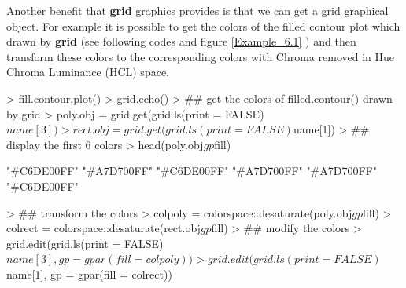 \documentclass{report}
\begin{document}
\newpage
Another benefit that \textbf{grid} graphics provides is that we can get a grid graphical object. For example it is possible to get the colors of the filled contour plot which drawn by \textbf{grid} (see following codes and figure \ref{Example_6.1} ) and then transform these colors to the corresponding colors with Chroma removed in Hue Chroma Luminance (HCL) space.
\begin{Schunk}
\begin{Sinput}
> fill.contour.plot()
> grid.echo()
> ## get the colors of filled.contour() drawn by grid
> poly.obj = grid.get(grid.ls(print = FALSE)$name[3])
> rect.obj = grid.get(grid.ls(print = FALSE)$name[1])
> ## display the first 6 colors
> head(poly.obj$gp$fill)
\end{Sinput}
\begin{Soutput}
[1] "#C6DE00FF" "#A7D700FF" "#C6DE00FF" "#A7D700FF" "#A7D700FF" "#C6DE00FF"
\end{Soutput}
\begin{Sinput}
> ## transform the colors
> colpoly = colorspace::desaturate(poly.obj$gp$fill)
> colrect = colorspace::desaturate(rect.obj$gp$fill)
> ## modify the colors
> grid.edit(grid.ls(print = FALSE)$name[3], gp = gpar(fill = colpoly))
> grid.edit(grid.ls(print = FALSE)$name[1], gp = gpar(fill = colrect))
\end{Sinput}
\end{Schunk}
\end{document}
